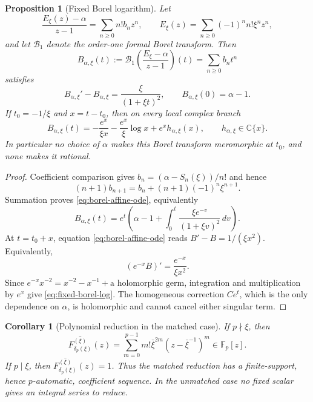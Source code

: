 \documentclass[11pt]{article}
\newtheorem{proposition}[theorem]{Proposition}
\newtheorem{corollary}[theorem]{Corollary}
\theoremstyle{definition}
\theoremstyle{remark}
\begin{document}
\begin{proposition}[Fixed Borel logarithm]
\label{prop:fixed-borel-logarithm}
Let
\[
 \frac{E_\xi(z)-\alpha}{z-1}=\sum_{n\geq0}n!b_nz^n,
 \qquad
 E_\xi(z)=\sum_{n\geq0}(-1)^nn!\xi^nz^n,
\]
and let $\mathcal B_1$ denote the order-one formal Borel transform.  Then
\[
 B_{\alpha,\xi}(t):=
 \mathcal B_1\!\left(\frac{E_\xi-\alpha}{z-1}\right)(t)
 =\sum_{n\geq0}b_nt^n
\]
satisfies
\begin{equation}
 B_{\alpha,\xi}'-B_{\alpha,\xi}
 =\frac{\xi}{(1+\xi t)^2},
 \qquad B_{\alpha,\xi}(0)=\alpha-1.
\label{eq:borel-affine-ode}
\end{equation}
If $t_0=-1/\xi$ and $x=t-t_0$, then on every local complex branch
\begin{equation}
 B_{\alpha,\xi}(t)
 =-\frac{e^x}{\xi x}-\frac{e^x}{\xi}\log x+e^xh_{\alpha,\xi}(x),
 \qquad h_{\alpha,\xi}\in\mathbb C\{x\}.
\label{eq:fixed-borel-log}
\end{equation}
In particular no choice of $\alpha$ makes this Borel transform meromorphic
at $t_0$, and none makes it rational.
\end{proposition}

\begin{proof}
Coefficient comparison gives
$b_n=(\alpha-S_n(\xi))/n!$ and hence
\[
 (n+1)b_{n+1}=b_n+(n+1)(-1)^n\xi^{n+1}.
\]
Summation proves \eqref{eq:borel-affine-ode}, equivalently
\[
 B_{\alpha,\xi}(t)=e^t\left(
 \alpha-1+\int_0^t\frac{\xi e^{-v}}{(1+\xi v)^2}\,dv\right).
\]
At $t=t_0+x$, equation \eqref{eq:borel-affine-ode} reads
$B'-B=1/(\xi x^2)$.  Equivalently,
\[
 (e^{-x}B)'=\frac{e^{-x}}{\xi x^2}.
\]
Since
$e^{-x}x^{-2}=x^{-2}-x^{-1}+\text{a holomorphic germ}$, integration and
multiplication by $e^x$ give \eqref{eq:fixed-borel-log}.  The homogeneous
correction $Ce^t$, which is the only dependence on $\alpha$, is holomorphic
and cannot cancel either singular term.
\end{proof}

\begin{corollary}[Polynomial reduction in the matched case]
\label{cor:matched-polynomial-reduction}
If $p\nmid\xi$, then
\begin{equation}
 \overline{F_{\delta_p(\xi)}^{(\xi)}}(z)
 =\sum_{m=0}^{p-1}m!\bar\xi^{2m}
       (z-\bar\xi^{-1})^m\in\mathbb F_p[z].
\label{eq:matched-polynomial-mod-p}
\end{equation}
If $p\mid\xi$, then
$\overline{F_{\delta_p(\xi)}^{(\xi)}}(z)=1$.  Thus the matched reduction
has a finite-support, hence $p$-automatic, coefficient sequence.  In the
unmatched case no fixed scalar gives an integral series to reduce.
\end{corollary}
\end{document}
